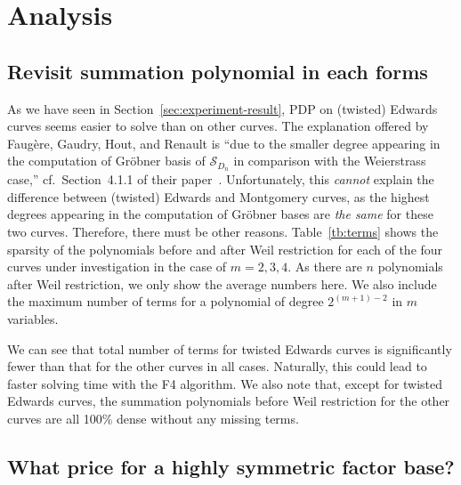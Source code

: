
\section{Analysis}
\label{sec:analysis}

\subsection{Revisit summation polynomial in each forms}

As we have seen in Section~\ref{sec:experiment-result}, PDP on
(twisted) Edwards curves seems easier to solve than on other curves.
%
The explanation offered by Faug\`ere, Gaudry, Hout, and Renault is
``due to the smaller degree appearing in the computation of Gr\"obner
basis of $\mathscr S_{D_n}$ in comparison with the Weierstrass case,''
cf.~Section~4.1.1 of their
paper~\cite{DBLP:journals/joc/FaugereGHR14}.
%
Unfortunately, this \emph{cannot} explain the difference between
(twisted) Edwards and Montgomery curves, as the highest degrees
appearing in the computation of Gr\"obner bases are \emph{the same}
for these two curves.
%
Therefore, there must be other reasons.
%
Table~\ref{tb:terms} shows the sparsity of the polynomials before and
after Weil restriction for each of the four curves under investigation
in the case of $m=2,3,4$.
%
As there are $n$ polynomials after Weil restriction, we only show the
average numbers here.
%
We also include the maximum number of terms for a polynomial of degree
$2^{(m+1)-2}$ in $m$ variables.
%


We can see that total number of terms for twisted Edwards curves is
significantly fewer than that for the other curves in all cases.
%
Naturally, this could lead to faster solving time with the F4
algorithm.
%
We also note that, except for twisted Edwards curves, the summation
polynomials before Weil restriction for the other curves are all 100\%
dense without any missing terms.





\subsection{What price for a highly symmetric factor base?}
\label{sec:price}

